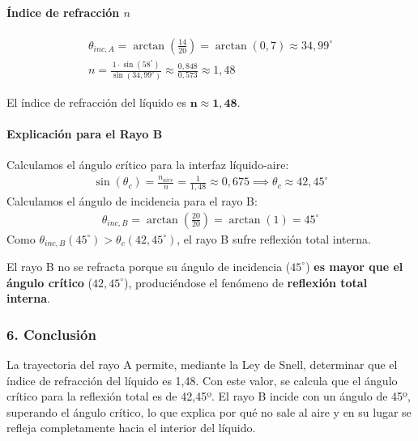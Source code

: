 \paragraph{Índice de refracción $n$}
\begin{gather}
    \theta_{inc,A} = \arctan\left(\frac{14}{20}\right) = \arctan(0,7) \approx 34,99^\circ \\
    n = \frac{1 \cdot \sin(58^\circ)}{\sin(34,99^\circ)} \approx \frac{0,848}{0,573} \approx 1,48
\end{gather}
\begin{cajaresultado}
El índice de refracción del líquido es $\boldsymbol{n \approx 1,48}$.
\end{cajaresultado}
\paragraph{Explicación para el Rayo B}
Calculamos el ángulo crítico para la interfaz líquido-aire:
\begin{gather}
    \sin(\theta_c) = \frac{n_{aire}}{n} = \frac{1}{1,48} \approx 0,675 \implies \theta_c \approx 42,45^\circ
\end{gather}
Calculamos el ángulo de incidencia para el rayo B:
\begin{gather}
    \theta_{inc,B} = \arctan\left(\frac{20}{20}\right) = \arctan(1) = 45^\circ
\end{gather}
Como $\theta_{inc,B} (45^\circ) > \theta_c (42,45^\circ)$, el rayo B sufre reflexión total interna.
\begin{cajaresultado}
El rayo B no se refracta porque su ángulo de incidencia ($45^\circ$) \textbf{es mayor que el ángulo crítico} ($42,45^\circ$), produciéndose el fenómeno de \textbf{reflexión total interna}.
\end{cajaresultado}
\subsubsection*{6. Conclusión}
\begin{cajaconclusion}
La trayectoria del rayo A permite, mediante la Ley de Snell, determinar que el índice de refracción del líquido es 1,48. Con este valor, se calcula que el ángulo crítico para la reflexión total es de 42,45º. El rayo B incide con un ángulo de 45º, superando el ángulo crítico, lo que explica por qué no sale al aire y en su lugar se refleja completamente hacia el interior del líquido.
\end{cajaconclusion}
\newpage

